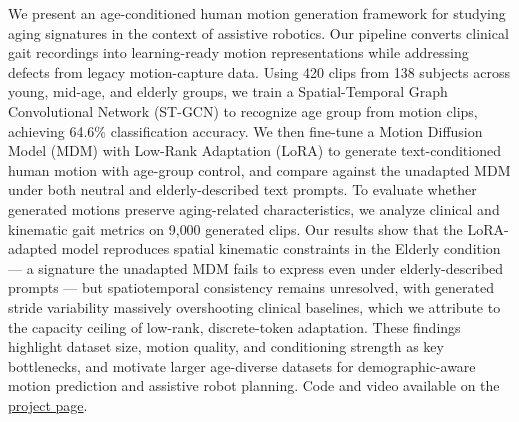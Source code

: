 We present an age-conditioned human motion generation framework for studying aging signatures in the context of assistive robotics.
Our pipeline converts clinical gait recordings into learning-ready motion representations while addressing defects from legacy motion-capture data.
Using 420 clips from 138 subjects across young, mid-age, and elderly groups, we train a Spatial-Temporal Graph Convolutional Network (ST-GCN) to recognize age group from motion clips, achieving 64.6\% classification accuracy.
We then fine-tune a Motion Diffusion Model (MDM) with Low-Rank Adaptation (LoRA) to generate text-conditioned human motion with age-group control, and compare against the unadapted MDM under both neutral and elderly-described text prompts.
To evaluate whether generated motions preserve aging-related characteristics, we analyze clinical and kinematic gait metrics on 9{,}000 generated clips.
Our results show that the LoRA-adapted model reproduces spatial kinematic constraints in the Elderly condition --- a signature the unadapted MDM fails to express even under elderly-described prompts --- but spatiotemporal consistency remains unresolved, with generated stride variability massively overshooting clinical baselines, which we attribute to the capacity ceiling of low-rank, discrete-token adaptation.
These findings highlight dataset size, motion quality, and conditioning strength as key bottlenecks, and motivate larger age-diverse datasets for demographic-aware motion prediction and assistive robot planning.
Code and video available on the \href{https://catr1xliu.github.io/Notebook/Aging-Motion-Project/}{project page}.